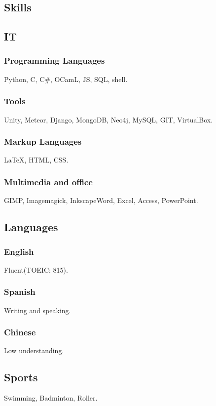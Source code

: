 \documentclass{article}
\begin{document}
\begin{multicols}{2}
        \columnbreak

        \section{Skills}
            \subsection{IT}
                \subsubsection{Programming Languages}
                    Python, C, C\#, OCamL, JS, SQL, shell.
                \subsubsection{Tools}
                    Unity, Meteor, Django,  MongoDB, Neo4j, MySQL, GIT, VirtualBox.
                \subsubsection{Markup Languages}
                    {\LaTeX}, HTML, CSS.
                \subsubsection{Multimedia and office}
                    GIMP, Imagemagick, InkscapeWord, Excel, Access, PowerPoint.
            \subsection{Languages}
                \subsubsection{English}
                    Fluent(TOEIC: 815).
                \subsubsection{Spanish}
                    Writing and speaking.
                \subsubsection{Chinese}
                    Low understanding.
                \subsection{Sports}
                    Swimming, Badminton, Roller.
    \end{multicols}
\end{document}
